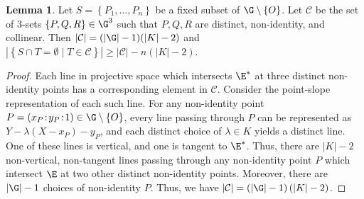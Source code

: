 \documentclass[11pt,letterpaper]{article}
\theoremstyle{definition}
\newtheorem{lemm}[theorem]{Lemma}
\newcommand{\6}{\mathbf}
\newcommand{\7}{\mathcal}
\begin{document}
\begin{lemm}
\label{lem:number_collinear_triples}
Let $S=\left\{P_1, \ldots, P_n\right\}$ be a fixed subset of $\G \setminus \left\{O\right\}$. Let $\mathcal{C}$ be the set of $3$-sets $\left\{P, Q, R\right\} \in \G^3$ such that $P, Q, R$ are distinct, non-identity, and collinear. Then $\left|\mathcal{C}\right| = (\left|\G\right|-1)(\left|K\right|-2)$ and $\left|\left\{S \cap T = \emptyset \mid T \in \mathcal{C}\right\}\right| \geq \left|\mathcal{C}\right| - n(\left|K\right|-2)$. 
\end{lemm}
\begin{proof}
Each line in projective space which intersects $\E^*$ at three distinct non-identity points has a corresponding element in $\mathcal{C}$. Consider the point-slope representation of each such line. For any non-identity point $P = (x_P\!:\!y_P\!:\!1)\in \G \setminus \left\{O\right\}$, every line passing through $P$ can be represented as $Y - \lambda (X-x_P) - y_P$, and each distinct choice of $\lambda \in K$ yields a distinct line.  One of these lines is vertical, and one is tangent to $\E^*$. Thus, there are $\left|K\right|-2$ non-vertical, non-tangent lines passing through any non-identity point $P$ which intersect $\E$ at two other distinct non-identity points. Moreover, there are $\left|\G\right|-1$ choices of non-identity $P$. Thus, we have $\left|\mathcal{C}\right| = (\left|\G\right|-1)\left(\left|K\right|-2\right)$.


\end{proof}
\end{document}
